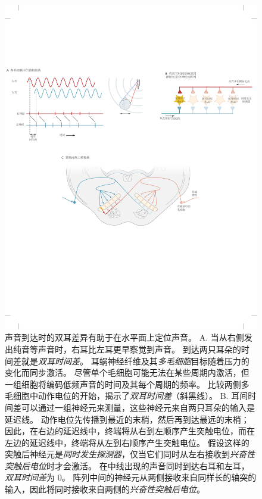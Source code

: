 \begin{figure}[htbp]
	\centering
	\includegraphics[width=1.0\linewidth]{chap28/fig_28_5}
	\caption{声音到达时的双耳差异有助于在水平面上定位声音。
		A. 当从右侧发出纯音等声音时，右耳比左耳更早察觉到声音。 
		到达两只耳朵的时间差就是\textit{双耳时间差}。 
		耳蜗神经纤维及其\textit{多毛细胞}目标随着压力的变化而同步激活。
		尽管单个毛细胞可能无法在某些周期内激活，但一组细胞将编码低频声音的时间及其每个周期的频率。 
		比较两侧多毛细胞中动作电位的开始，揭示了\textit{双耳时间差}（斜黑线）。 
		B. 耳间时间差可以通过一组神经元来测量，这些神经元来自两只耳朵的输入是延迟线\cite{jeffress1948place}。
		动作电位先传播到最近的末梢，然后再到达最远的末梢；
		因此，在右边的延迟线中，终端将从右到左顺序产生突触电位，而在左边的延迟线中，终端将从左到右顺序产生突触电位。
		假设这样的突触后神经元是\textit{同时发生探测器}，仅当它们同时从左右接收到\textit{兴奋性突触后电位}时才会激活。
		在中线出现的声音同时到达右耳和左耳，\textit{双耳时间差}为 0。
		阵列中间的神经元从两侧接收来自同样长的轴突的输入，因此将同时接收来自两侧的\textit{兴奋性突触后电位}。
}
\end{figure}
